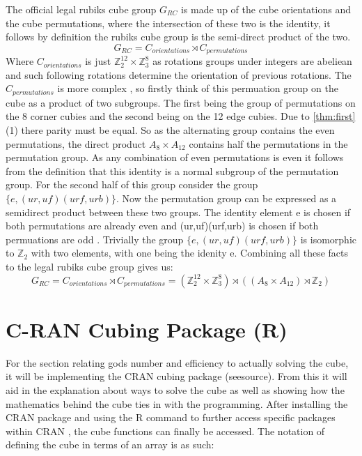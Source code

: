 \documentclass{article}
\newcounter{lem}[section]\setcounter{lem}{0}
\begin{document}
The official legal rubiks cube group $G_{RC}$ is made up of the cube orientations and the cube permutations, where the intersection of these two is the identity, it follows by definition the rubiks cube group is the semi-direct product of the two. 
\begin{equation}
G_{RC} = C_{orientations} \rtimes C_{permutations}
\end{equation}
Where $C_{orientations}$ is just $\mathbb{Z}_{2}^{12} \times \mathbb{Z}_{3}^{8}$ as rotations groups under integers are abeliean and such following rotations determine the orientation of previous rotations. 
The $C_{permutations}$ is more complex , so firstly think of this permuation group on the cube as a product of two subgroups. The first being the group of permutations on the 8 corner cubies and the second being on the 12 edge cubies. Due to \ref{thm:first}(1) there parity must be equal. So as the alternating group contains the even permutations, the direct product $A_8 \times A_{12}$ contains half the permutations in the permutation group. As any combination of even permutations is even it follows from the definition that this identity is a normal subgroup of the permutation group.
For the second half of this group consider the group $\{e,(ur,uf)(urf,urb)\}$. Now the permutation group can be expressed as a semidirect product between these two groups. The identity element e is chosen if both permutations are already even and (ur,uf)(urf,urb) is chosen if both permuations are odd \cite{final}. Trivially the group $\{e,(ur,uf)(urf,urb)\}$ is isomorphic to $\mathbb{Z}_2$ with two elements, with one being the idenity e. Combining all these facts to the legal rubiks cube group gives us: 
\begin{equation}
G_{RC} = C_{orientations} \rtimes C_{permutations} = (\mathbb{Z}_{2}^{12} \times \mathbb{Z}_{3}^{8}) \rtimes ((A_8 \times A_{12})\rtimes \mathbb{Z}_2)
\end{equation} 


\newpage
\section{C-RAN Cubing Package (R)}

For the section relating gods number and efficiency to actually solving the cube, it will be implementing the CRAN cubing package (seesource). From this it will
aid in the explanation about ways to solve the cube as well as showing how the mathematics behind the cube ties in with the programming.
After installing the CRAN package and using the R command to further access specific packages within CRAN , the cube functions can finally be accessed. The notation of defining the cube in terms of an array is as such:
\end{document}
